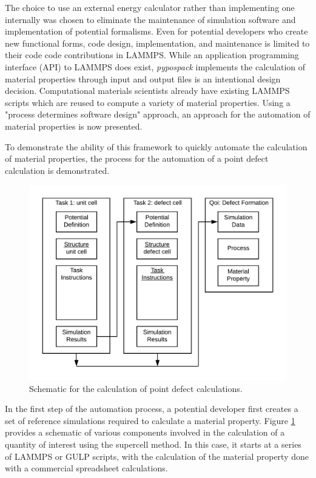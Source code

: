 The choice to use an external energy calculator rather than implementing one internally was chosen to eliminate the maintenance of simulation software and implementation of potential formalisms.  Even for potential developers who create new functional forms, code design, implementation, and maintenance is limited to their code code contributions in LAMMPS.
While an application programming interface (API) to LAMMPS does exist, \emph{pypospack} implements the calculation of material properties through input and output files is an intentional design decision.  Computational materials scientists already have existing LAMMPS scripts which are reused to compute a variety of material properties.  Using a "process determines software design" approach, an approach for the automation of material properties is now presented.

To demonstrate the ability of this framework to quickly automate the calculation of material properties, the process for the automation of a point defect calculation is demonstrated.

\begin{figure}[ht]
	\label{fig_point_defect_calculation}
	\centering
	\includegraphics[width=5in]{chapter6/img/fig_point_defect}
	\caption{Schematic for the calculation of point defect calculations.}
\end{figure}

In the first step of the automation process, a potential developer first creates a set of reference simulations required to calculate a material property.  Figure \ref{fig_point_defect_calculation} provides a schematic of various components involved in the calculation of a quantity of interest using the supercell method.  In this case, it starts at a series of LAMMPS or GULP scripts, with the calculation of the material property done with a commercial spreadsheet calculations.


